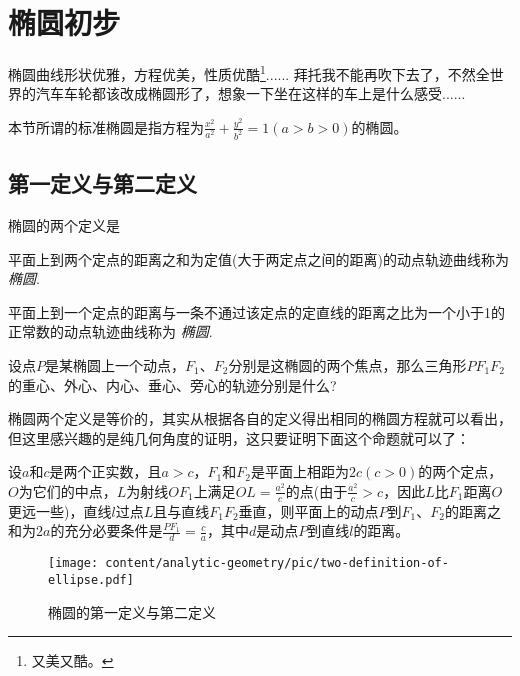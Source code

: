 
\section{椭圆初步}
\label{sec:oval-preliminary-discussion}

椭圆曲线形状优雅，方程优美，性质优酷\footnote{又美又酷。}...... 拜托我不能再吹下去了，不然全世界的汽车车轮都该改成椭圆形了，想象一下坐在这样的车上是什么感受......

本节所谓的标准椭圆是指方程为$\frac{x^2}{a^2}+\frac{y^2}{b^2}=1(a>b>0)$的椭圆。

\subsection{第一定义与第二定义}
\label{sec:the-two-definition-of-oval}

椭圆的两个定义是
\begin{definition}
  平面上到两个定点的距离之和为定值(大于两定点之间的距离)的动点轨迹曲线称为 \emph{椭圆}.
\end{definition}

\begin{definition}
  平面上到一个定点的距离与一条不通过该定点的定直线的距离之比为一个小于1的正常数的动点轨迹曲线称为 \emph{椭圆}.
\end{definition}

\begin{example}
  设点$P$是某椭圆上一个动点，$F_1$、$F_2$分别是这椭圆的两个焦点，那么三角形$PF_1F_2$的重心、外心、内心、垂心、旁心的轨迹分别是什么?
\end{example}

椭圆两个定义是等价的，其实从根据各自的定义得出相同的椭圆方程就可以看出，但这里感兴趣的是纯几何角度的证明，这只要证明下面这个命题就可以了：
\begin{statement}
设$a$和$c$是两个正实数，且$a>c$，$F_1$和$F_2$是平面上相距为$2c(c>0)$的两个定点，$O$为它们的中点，$L$为射线$OF_1$上满足$OL=\frac{a^2}{c}$的点(由于$\frac{a^2}{c}>c$，因此$L$比$F_1$距离$O$更远一些)，直线$l$过点$L$且与直线$F_1F_2$垂直，则平面上的动点$P$到$F_1$、$F_2$的距离之和为$2a$的充分必要条件是$\frac{PF_1}{d}=\frac{c}{a}$，其中$d$是动点$P$到直线$l$的距离。
\end{statement}

\begin{figure}[htbp]
  \centering
\texttt{[image: content/analytic-geometry/pic/two-definition-of-ellipse.pdf]}
\caption{椭圆的第一定义与第二定义}
\label{fig:two-definition-of-ellipse}
\end{figure}

